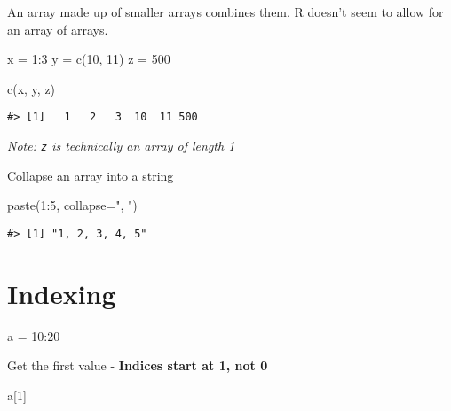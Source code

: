 \documentclass[
]{book}
\newenvironment{Shaded}{\begin{snugshade}}{\end{snugshade}}
\newcommand{\AttributeTok}[1]{\textcolor[rgb]{0.77,0.63,0.00}{#1}}
\newcommand{\DecValTok}[1]{\textcolor[rgb]{0.00,0.00,0.81}{#1}}
\newcommand{\FunctionTok}[1]{\textcolor[rgb]{0.00,0.00,0.00}{#1}}
\newcommand{\NormalTok}[1]{#1}
\newcommand{\OtherTok}[1]{\textcolor[rgb]{0.56,0.35,0.01}{#1}}
\newcommand{\SpecialCharTok}[1]{\textcolor[rgb]{0.00,0.00,0.00}{#1}}
\newcommand{\StringTok}[1]{\textcolor[rgb]{0.31,0.60,0.02}{#1}}
\begin{document}
An array made up of smaller arrays combines them. R doesn't seem to allow for an array of arrays.

\begin{Shaded}
\begin{Highlighting}[]
\NormalTok{x }\OtherTok{=} \DecValTok{1}\SpecialCharTok{:}\DecValTok{3}
\NormalTok{y }\OtherTok{=} \FunctionTok{c}\NormalTok{(}\DecValTok{10}\NormalTok{, }\DecValTok{11}\NormalTok{)}
\NormalTok{z }\OtherTok{=} \DecValTok{500}

\FunctionTok{c}\NormalTok{(x, y, z)}
\end{Highlighting}
\end{Shaded}

\begin{verbatim}
#> [1]   1   2   3  10  11 500
\end{verbatim}

\emph{Note: \texttt{z} is technically an array of length 1}

Collapse an array into a string

\begin{Shaded}
\begin{Highlighting}[]
\FunctionTok{paste}\NormalTok{(}\DecValTok{1}\SpecialCharTok{:}\DecValTok{5}\NormalTok{, }\AttributeTok{collapse=}\StringTok{", "}\NormalTok{)}
\end{Highlighting}
\end{Shaded}

\begin{verbatim}
#> [1] "1, 2, 3, 4, 5"
\end{verbatim}

\hypertarget{indexing}{%
\section{Indexing}\label{indexing}}

\begin{Shaded}
\begin{Highlighting}[]
\NormalTok{a }\OtherTok{=} \DecValTok{10}\SpecialCharTok{:}\DecValTok{20}
\end{Highlighting}
\end{Shaded}

Get the first value - \textbf{Indices start at 1, not 0}

\begin{Shaded}
\begin{Highlighting}[]
\NormalTok{a[}\DecValTok{1}\NormalTok{]}
\end{Highlighting}
\end{Shaded}
\end{document}
